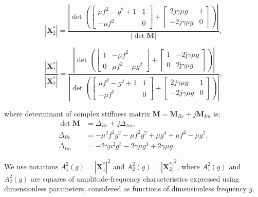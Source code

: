 \documentclass[12pt, a4paper]{article}
\begin{document}
	\begin{equation}
		|\mathbf{X}^{*}_{2}| = \frac{\left|\det\left(
			\begin{bmatrix}
				\mu f^2 - g^2 + 1 & 1 \\
				-\mu f^2 & 0
			\end{bmatrix}
			+
			\begin{bmatrix}
				2 j\gamma\mu g & 1 \\
				-2 j \gamma\mu g & 0
			\end{bmatrix}
			\right)\right|}{|\det\mathbf{M}|},
	\end{equation}
	
	
	\begin{equation}
		\frac{|\mathbf{X}^{*}_{1}|}{	|\mathbf{X}^{*}_{2}|} = \frac{\left|\det\left(
			\begin{bmatrix}
				1 & -\mu f^{2} \\
				0 & \mu f^{2} - \mu g^{2}
			\end{bmatrix}
			+
			\begin{bmatrix}
				1 & -2\mathrm{j}\gamma\mu g \\
				0 & 2\mathrm{j}\gamma\mu g
			\end{bmatrix}
			\right)\right|}
		{\left|\det\left(
			\begin{bmatrix}
				\mu f^2 - g^2 + 1 & 1 \\
				-\mu f^2 & 0
			\end{bmatrix}
			+
			\begin{bmatrix}
				2 j\gamma\mu g & 1 \\
				-2 j \gamma\mu g & 0
			\end{bmatrix}
			\right)\right|},
	\end{equation}
	
	
	
	where determinant of complex stiffness matrix $\mathbf{M}=\mathbf{M}_{Re}+j\mathbf{M}_{Im}$ is:
	\begin{align}
		\det \mathbf{M} &= \Delta_{Re} + j \Delta_{Im},
		\label{eq:determinant} \\
		\Delta_{Re} &= -\mu^2 f^2 g^2 - \mu f^2 g^2 + \mu g^4 + \mu f^2 - \mu g^2,
		\label{eq:DeltaR} \\
		\Delta_{Im} &= -2\gamma\mu^2 g^3 - 2\gamma\mu g^3 + 2\gamma\mu g.
		\label{eq:DeltaI}
	\end{align}
	
	We use notations $A_1^2(g)=|\mathbf{X}^{*}_{1}|^2$ and $A_2^2(g)=|\mathbf{X}^{*}_{2}|^2$, where $A_1^2(g)$ and $A_2^2(g)$ are squares of amplitude-frequency characteristics expressed using dimensionless parameters, considered as functions of dimensionless frequency $g$.
	
\end{document}
